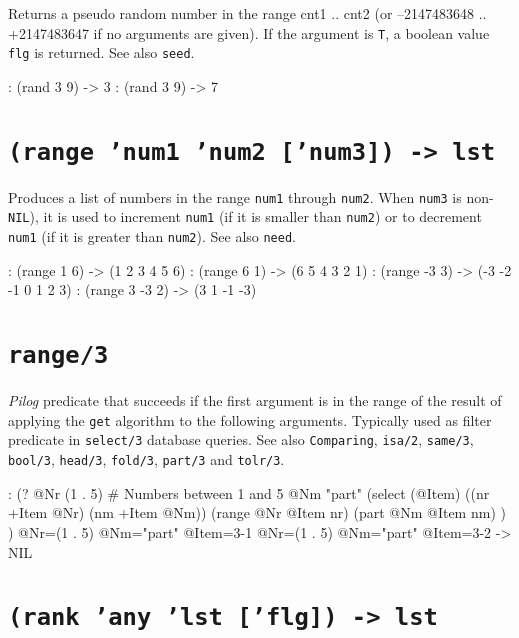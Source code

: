 Returns a pseudo random number in the range cnt1 .. cnt2 (or
--2147483648 .. +2147483647 if no arguments are given). If the argument
is \texttt{T}, a boolean value \texttt{flg} is returned. See also \texttt{seed}.


\begin{wideverbatim}
: (rand 3 9)
-> 3
: (rand 3 9)
-> 7
\end{wideverbatim}

 
\section*{\texttt{(range 'num1 'num2 ['num3]) -> lst}}
\label{sec:func-ref-R-(range 'num1 'num2 ['num3]) -> lst}


Produces a list of numbers in the range \texttt{num1} through \texttt{num2}. When
\texttt{num3} is non-\texttt{NIL}), it is used to increment \texttt{num1} (if it is smaller
than \texttt{num2}) or to decrement \texttt{num1} (if it is greater than \texttt{num2}). See
also \texttt{need}.


\begin{wideverbatim}
: (range 1 6)
-> (1 2 3 4 5 6)
: (range 6 1)
-> (6 5 4 3 2 1)
: (range -3 3)
-> (-3 -2 -1 0 1 2 3)
: (range 3 -3 2)
-> (3 1 -1 -3)
\end{wideverbatim}

 
\section*{\texttt{range/3}}
\label{sec:func-ref-R-range/3}


\emph{Pilog} predicate that succeeds if the first argument
is in the range of the result of applying the \texttt{get} algorithm to the
following arguments. Typically used as filter predicate in \texttt{select/3}
database queries. See also \texttt{Comparing}, \texttt{isa/2}, \texttt{same/3}, \texttt{bool/3},
\texttt{head/3}, \texttt{fold/3}, \texttt{part/3} and \texttt{tolr/3}.


\begin{wideverbatim}
: (?
   @Nr (1 . 5)  # Numbers between 1 and 5
   @Nm "part"
   (select (@Item)
      ((nr +Item @Nr) (nm +Item @Nm))
      (range @Nr @Item nr)
      (part @Nm @Item nm) ) )
      @Nr=(1 . 5) @Nm="part" @Item={3-1}
      @Nr=(1 . 5) @Nm="part" @Item={3-2}
-> NIL
\end{wideverbatim}

 
\section*{\texttt{(rank 'any 'lst ['flg]) -> lst}}
\label{sec:func-ref-R-(rank 'any 'lst ['flg]) -> lst}


